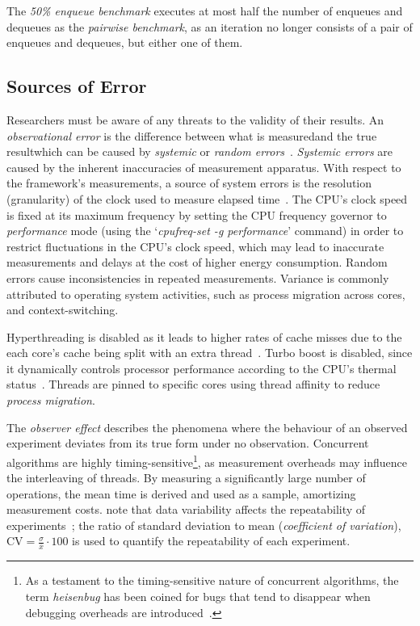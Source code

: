 The \emph{50\% enqueue benchmark} executes at most
half the number of enqueues and dequeues as the \emph{pairwise
benchmark}, as an iteration no longer consists of a pair of
enqueues and dequeues, but either one of them.

\subsection{Sources of Error}
Researchers must be aware of any threats to the validity of
their results. 
An \emph{observational error} is the difference between what is
measured\textemdash and the true result\textemdash which can be caused by
\emph{systemic} or \emph{random errors}~\citep{lelbach2015cppbenchmarking}.
\emph{Systemic errors} are caused by the inherent inaccuracies of measurement
apparatus. 
With respect to the framework's measurements, a source of system errors is the
resolution (granularity) of the clock used to measure elapsed
time~\citep{lelbach2015cppbenchmarking}. 
The CPU's clock speed is fixed at its maximum frequency by setting the CPU
frequency governor to \emph{performance} mode (using the `\emph{cpufreq-set -g
performance}' command) in order to restrict fluctuations in the CPU's clock
speed, which may lead to inaccurate measurements and delays at the cost of
higher energy consumption. Random errors cause inconsistencies in repeated
measurements.
Variance is commonly attributed to operating system activities, such as process
migration across cores, and context-switching.

Hyperthreading is disabled as it leads to higher rates of cache misses due to
the each core's cache being split with an extra
thread~\citep{fog2020optimizing}.
Turbo boost is disabled, since it dynamically controls processor performance
according to the CPU's thermal status~\citep[Section~14.3.3]{intel2021system}.
Threads are pinned to specific cores using thread affinity to reduce \emph{process
migration}.

The \emph{observer effect} describes the phenomena where the behaviour of an
observed experiment deviates
from its true form under no observation. Concurrent algorithms are
highly timing-sensitive\footnote{As a testament to the timing-sensitive nature
of concurrent algorithms, the term \emph{heisenbug} has been coined for bugs
that tend to disappear when debugging overheads are
introduced~\cite{perfbook2021}.}, as measurement overheads may influence the
interleaving of threads. By measuring a significantly large
number of operations, the mean time is derived and used as a sample, amortizing
measurement costs. \citeauthor{aceto2021benchmarking} note that
data variability affects the repeatability of experiments~\citep{aceto2021benchmarking}; the ratio of standard deviation to
mean (\emph{coefficient of variation}), $\text{CV} = \frac{\sigma}{\bar{x}}
\cdot 100$ is used to quantify the repeatability of each experiment.

